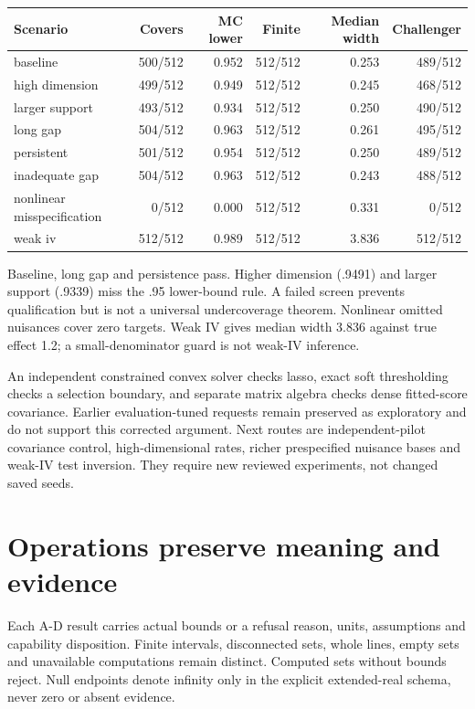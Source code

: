 \begin{center}\footnotesize\begin{tabular}{lrrrrr}\toprule
Scenario & Covers & MC lower & Finite & Median width & Challenger\\
\midrule
baseline & 500/512 & 0.952 & 512/512 & 0.253 & 489/512 \\
high dimension & 499/512 & 0.949 & 512/512 & 0.245 & 468/512 \\
larger support & 493/512 & 0.934 & 512/512 & 0.250 & 490/512 \\
long gap & 504/512 & 0.963 & 512/512 & 0.261 & 495/512 \\
persistent & 501/512 & 0.954 & 512/512 & 0.250 & 489/512 \\
inadequate gap & 504/512 & 0.963 & 512/512 & 0.243 & 488/512 \\
nonlinear misspecification & 0/512 & 0.000 & 512/512 & 0.331 & 0/512 \\
weak iv & 512/512 & 0.989 & 512/512 & 3.836 & 512/512 \\
\bottomrule\end{tabular}\end{center}


Baseline, long gap and persistence pass. Higher dimension (.9491) and larger support (.9339) miss the .95 lower-bound rule. A failed screen prevents qualification but is not a universal undercoverage theorem. Nonlinear omitted nuisances cover zero targets. Weak IV gives median width 3.836 against true effect 1.2; a small-denominator guard is not weak-IV inference.

An independent constrained convex solver checks lasso, exact soft thresholding checks a selection boundary, and separate matrix algebra checks dense fitted-score covariance. Earlier evaluation-tuned requests remain preserved as exploratory and do not support this corrected argument. Next routes are independent-pilot covariance control, high-dimensional rates, richer prespecified nuisance bases and weak-IV test inversion. They require new reviewed experiments, not changed saved seeds.

\section{Operations preserve meaning and evidence}
Each A-D result carries actual bounds or a refusal reason, units, assumptions and capability disposition. Finite intervals, disconnected sets, whole lines, empty sets and unavailable computations remain distinct. Computed sets without bounds reject. Null endpoints denote infinity only in the explicit extended-real schema, never zero or absent evidence.

